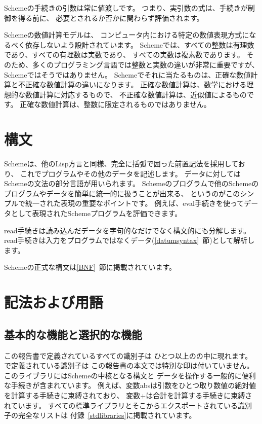 \vest Schemeの手続きの引数は常に値渡しです。
つまり、実引数の式は、手続きが制御を得る前に、
必要とされるか否かに関わらず評価されます。

\vest Schemeの数値計算モデルは、
コンピュータ内における特定の数値表現方式になるべく依存しないよう設計されています。
Schemeでは、すべての整数は有理数であり、すべての有理数は実数であり、
すべての実数は複素数であります。
そのため、多くのプログラミング言語では整数と実数の違いが非常に重要ですが、
Schemeではそうではありません。
Schemeでそれに当たるものは、正確な数値計算と不正確な数値計算の違いになります。
正確な数値計算は、数学における理想的な数値計算に対応するもので、
不正確な数値計算は、近似値によるものです。
正確な数値計算は、整数に限定されるものではありません。

\section{構文}

Schemeは、他のLisp方言と同様、完全に括弧で囲った前置記法を採用しており、
これでプログラムやその他のデータを記述します。
データに対してはSchemeの文法の部分言語が用いられます。
Schemeのプログラムで他のSchemeのプログラムやデータを簡単に統一的に扱うことが出来る、
というのがこのシンプルで統一された表現の重要なポイントです。
例えば、{\cf eval}手続きを使ってデータとして表現されたSchemeプログラムを評価できます。

{\cf read}手続きは読み込んだデータを字句的なだけでなく構文的にも分解します。
{\cf read}手続きは入力をプログラムではなくデータ(\ref{datumsyntax}~節)として解析します。

Schemeの正式な構文は\ref{BNF}~節に掲載されています。


\section{記法および用語}


\subsection{基本的な機能と選択的な機能}
\label{qualifiers}

この報告書で定義されているすべての識別子は
ひとつ以上のの中に現れます。
で定義されている識別子は
この報告書の本文では特別な印は付いていません。
このライブラリにはSchemeの中核となる構文と
データを操作する一般的に便利な手続きが含まれています。
例えば、変数{\cf abs}は引数をひとつ取り数値の絶対値を計算する手続きに束縛されており、
変数{\cf +}は合計を計算する手続きに束縛されています。
すべての標準ライブラリとそこからエクスポートされている識別子の完全なリストは
付録~\ref{stdlibraries}に掲載されています。

